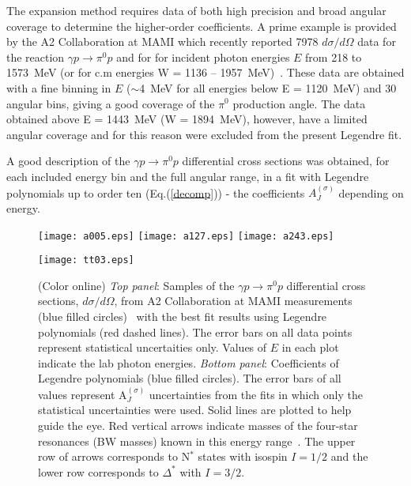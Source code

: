 \documentclass[prc,reprint,onecolumn,amsmath,amssymb,superscriptaddress]{revtex4-1}
\begin{document}
The expansion method requires data of both high precision and broad
angular coverage to determine the higher-order coefficients. 
A prime example is provided by 
the A2 Collaboration at MAMI which recently reported
7978 $d\sigma/d\Omega$ data for the reaction $\gamma p\to\pi^0p$
and for for incident photon energies $E$ from 218 to 1573~MeV
(or for c.m energies W = 1136 -- 1957~MeV)~\cite{A2}. These data are
obtained with a fine binning in $E$ ($\sim$4~MeV for all energies
below E = 1120~MeV) and 30 angular bins, giving a good coverage of 
the $\pi^0$ production angle.  The data obtained above E = 1443~MeV
(W = 1894~MeV), however, have a limited angular coverage and for this
reason were excluded from the present Legendre fit.

A good description of the $\gamma p\to
\pi^0p$ differential cross sections was obtained, for each included energy bin
and the full angular range, in a fit with Legendre
polynomials up to order ten (Eq.(\ref{decomp})) - the
coefficients $A^{(\sigma)}_J$ depending on energy.

\begin{figure*}[htb!]
\begin{center}
	\texttt{[image: a005.eps]}
        \texttt{[image: a127.eps]}
        \texttt{[image: a243.eps]}
\end{center}
\begin{center}
        \texttt{[image: tt03.eps]}
\end{center}

        \caption {(Color online) 
		\textit{Top panel}: Samples of the $\gamma p\to\pi^0p$ 
		differential cross sections, $d\sigma/d\Omega$, from 
		A2 Collaboration 
		at MAMI measurements (blue filled circles)~\protect\cite{A2} 
		with the best fit results using Legendre polynomials 
		(red dashed lines). The 
		error bars on all data points represent statistical 
		uncertaities only. Values of $E$ in each plot indicate 
		the lab photon energies. 
		\textit{Bottom panel}: Coefficients of Legendre 
		polynomials (blue filled circles). The error bars of 
		all values represent A$^{(\sigma)}_J$ uncertainties 
		from the fits in which only the statistical uncertainties 
		were used. Solid lines are plotted to help guide 
		the eye. Red vertical arrows indicate masses of the 
		four-star resonances (BW masses) known in this energy 
		range~\protect\cite{PDG}. The upper row of arrows 
		corresponds to N$^\ast$ states with isospin $I = 1/2$ and the 
		lower row corresponds to $\Delta^\ast$ with $I = 3/2$.}
		\label{fig:legA2}
\end{figure*}
\end{document}
